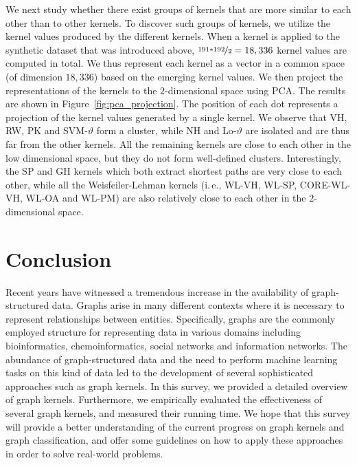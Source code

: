 \documentclass[twoside,11pt]{article}
\newcommand{\ie}{i.\,e., }
\begin{document}
We next study whether there exist groups of kernels that are more similar to each other than to other kernels.
To discover such groups of kernels, we utilize the kernel values produced by the different kernels.
When a kernel is applied to the synthetic dataset that was introduced above, $\nicefrac{191*192}{2} = 18,336$ kernel values are computed in total.
We thus represent each kernel as a vector in a common space (of dimension $18,336$) based on the emerging kernel values.
We then project the representations of the kernels to the $2$-dimensional space using PCA.
The results are shown in Figure~\ref{fig:pca_projection}.
The position of each dot represents a projection of the kernel values generated by a single kernel.
We observe that VH, RW, PK and SVM-$\vartheta$ form a cluster, while NH and Lo-$\vartheta$ are isolated and are thus far from the other kernels.
All the remaining kernels are close to each other in the low dimensional space, but they do not form well-defined clusters.
Interestingly, the SP and GH kernels which both extract shortest paths are very close to each other, while all the Weisfeiler-Lehman kernels (\ie WL-VH, WL-SP, CORE-WL-VH, WL-OA and WL-PM) are also relatively close to each other in the $2$-dimensional space.

\section{Conclusion}\label{sec:conclusion}
Recent years have witnessed a tremendous increase in the availability of graph-structured data.
Graphs arise in many different contexts where it is necessary to represent relationships between entities.
Specifically, graphs are the commonly employed structure for representing data in various domains including bioinformatics, chemoinformatics, social networks and information networks.
The abundance of graph-structured data and the need to perform machine learning tasks on this kind of data led to the development of several sophisticated approaches such as graph kernels.
In this survey, we provided a detailed overview of graph kernels.
Furthermore, we empirically evaluated the effectiveness of several graph kernels, and measured their running time.
We hope that this survey will provide a better understanding of the current progress on graph kernels and graph classification, and offer some guidelines on how to apply these approaches in order to solve real-world problems.
\end{document}
